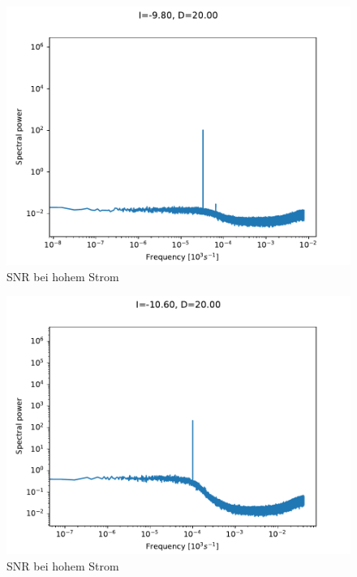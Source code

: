 \documentclass[12pt,a4paper]{article}
\begin{document}
\begin{figure}[H]
	\centering
	\includegraphics[scale=1]{d20i98.pdf}\caption{SNR bei hohem Strom}
	\label{spek209}
\end{figure}
\begin{figure}[H]
	\centering
	\includegraphics[scale=1]{d20i106.pdf}\caption{SNR bei hohem Strom}
	\label{spek208}
\end{figure}
\end{document}
